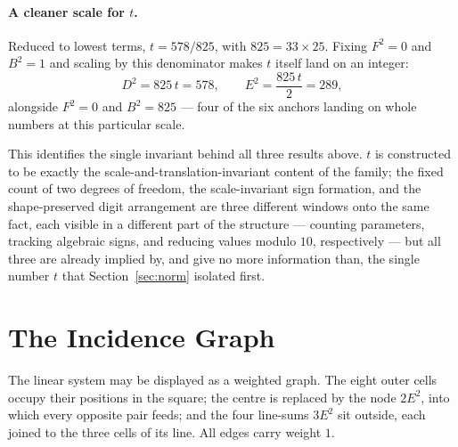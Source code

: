 \documentclass[12pt]{article}
\theoremstyle{remark}
\begin{document}
\paragraph{A cleaner scale for $t$.}
Reduced to lowest terms, $t = 578/825$, with $825 = 33\times25$. Fixing
$F^2=0$ and $B^2=1$ and scaling by this denominator makes $t$ itself
land on an integer:
\[
D^2 = 825\,t = 578, \qquad E^2 = \frac{825\,t}{2} = 289,
\]
alongside $F^2=0$ and $B^2=825$ --- four of the six anchors landing on
whole numbers at this particular scale.

This identifies the single invariant behind all three results above.
$t$ is constructed to be exactly the scale-and-translation-invariant
content of the family; the fixed count of two degrees of freedom, the
scale-invariant sign formation, and the shape-preserved digit
arrangement are three different windows onto the same fact, each
visible in a different part of the structure ---
counting parameters, tracking algebraic signs, and reducing values
modulo $10$, respectively --- but all three are already implied by,
and give no more information than, the single number $t$ that
Section~\ref{sec:norm} isolated first.

\section{The Incidence Graph}

The linear system may be displayed as a weighted graph. The eight
outer cells occupy their positions in the square; the centre is
replaced by the node $2E^2$, into which every opposite pair feeds; and
the four line-sums $3E^2$ sit outside, each joined to the three cells
of its line. All edges carry weight $1$.

\begin{center}
\end{center}
\end{document}
